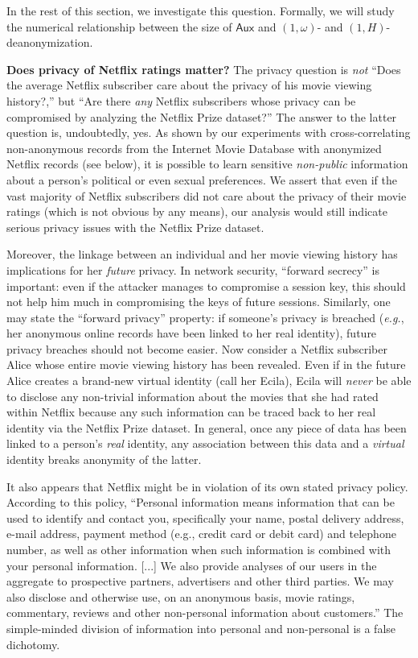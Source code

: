 \documentclass[11pt]{article}
\newcommand{\eg}{\emph{e.g.}}
\newcommand{\Aux}{\textsf{Aux}}
\begin{document}
In the rest of this section, we investigate this question.  Formally,
we will study the numerical relationship between the size of $\Aux$
and $(1,\omega)$- and $(1,H)$-deanonymization.

\vspace{1ex}
\noindent
\textbf{Does privacy of Netflix ratings matter?}
The privacy question is \emph{not} ``Does the average Netflix
subscriber care about the privacy of his movie viewing history?,''
but ``Are there \emph{any} Netflix subscribers whose privacy can be
compromised by analyzing the Netflix Prize dataset?''  The answer to
the latter question is, undoubtedly, yes.  As shown by our experiments
with cross-correlating non-anonymous records from the Internet Movie
Database with anonymized Netflix records (see below), it is possible to
learn sensitive \emph{non-public} information about a person's political
or even sexual preferences.  We assert that even if the vast majority
of Netflix subscribers did not care about the privacy of their movie
ratings (which is not obvious by any means), our analysis would
still indicate serious privacy issues with the Netflix Prize dataset.

Moreover, the linkage between an individual and her movie viewing history
has implications for her \emph{future} privacy.  In network security,
``forward secrecy'' is important: even if the attacker manages to
compromise a session key, this should not help him much in compromising
the keys of future sessions.  Similarly, one may state the ``forward
privacy'' property: if someone's privacy is breached (\eg, her anonymous
online records have been linked to her real identity), future privacy
breaches should not become easier.  Now consider a Netflix subscriber
Alice whose entire movie viewing history has been revealed.  Even if in
the future Alice creates a brand-new virtual identity (call her Ecila),
Ecila will \emph{never} be able to disclose any non-trivial information
about the movies that she had rated within Netflix because any such
information can be traced back to her real identity via the Netflix
Prize dataset.  In general, once any piece of data has been linked to
a person's \emph{real} identity, any association between this data and
a \emph{virtual} identity breaks anonymity of the latter.

It also appears that Netflix might be in violation of its own stated
privacy policy.  According to this policy, ``Personal information
means information that can be used to identify and contact you,
specifically your name, postal delivery address, e-mail address,
payment method (e.g., credit card or debit card) and telephone number,
as well as other information when such information is combined with your
personal information.  [...]  We also provide analyses of our users in the
aggregate to prospective partners, advertisers and other third parties. We
may also disclose and otherwise use, on an anonymous basis, movie ratings,
commentary, reviews and other non-personal information about customers.''
The simple-minded division of information into personal and non-personal
is a false dichotomy.
\end{document}
